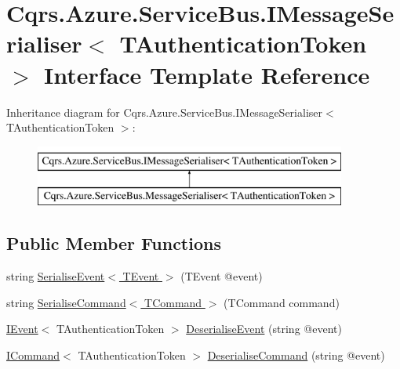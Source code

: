 \hypertarget{interfaceCqrs_1_1Azure_1_1ServiceBus_1_1IMessageSerialiser}{}\section{Cqrs.\+Azure.\+Service\+Bus.\+I\+Message\+Serialiser$<$ T\+Authentication\+Token $>$ Interface Template Reference}
\label{interfaceCqrs_1_1Azure_1_1ServiceBus_1_1IMessageSerialiser}
Inheritance diagram for Cqrs.\+Azure.\+Service\+Bus.\+I\+Message\+Serialiser$<$ T\+Authentication\+Token $>$\+:\begin{figure}[H]
\begin{center}
\leavevmode
\includegraphics[height=2.000000cm]{interfaceCqrs_1_1Azure_1_1ServiceBus_1_1IMessageSerialiser}
\end{center}
\end{figure}
\subsection*{Public Member Functions}
\begin{DoxyCompactItemize}
\item 
string \hyperlink{interfaceCqrs_1_1Azure_1_1ServiceBus_1_1IMessageSerialiser_af6e1bca15164a08308969794b089c31b}{Serialise\+Event$<$ T\+Event $>$} (T\+Event @event)
\item 
string \hyperlink{interfaceCqrs_1_1Azure_1_1ServiceBus_1_1IMessageSerialiser_a7454ac36eca3dd37d0c596e0406b4c81}{Serialise\+Command$<$ T\+Command $>$} (T\+Command command)
\item 
\hyperlink{interfaceCqrs_1_1Events_1_1IEvent}{I\+Event}$<$ T\+Authentication\+Token $>$ \hyperlink{interfaceCqrs_1_1Azure_1_1ServiceBus_1_1IMessageSerialiser_ab65c6e4a8c2a660ceb2236ee11fd33f6}{Deserialise\+Event} (string @event)
\item 
\hyperlink{interfaceCqrs_1_1Commands_1_1ICommand}{I\+Command}$<$ T\+Authentication\+Token $>$ \hyperlink{interfaceCqrs_1_1Azure_1_1ServiceBus_1_1IMessageSerialiser_aade6efce33aae849c4c6ed1e24211ecc}{Deserialise\+Command} (string @event)
\end{DoxyCompactItemize}


